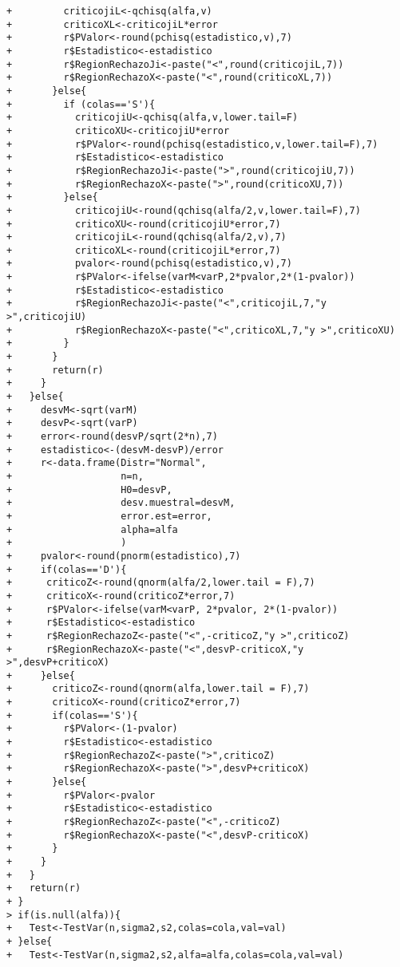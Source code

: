\begin{solucion}
\begin{verbatim}
+         criticojiL<-qchisq(alfa,v)
+         criticoXL<-criticojiL*error
+         r$PValor<-round(pchisq(estadistico,v),7)
+         r$Estadistico<-estadistico
+         r$RegionRechazoJi<-paste("<",round(criticojiL,7))
+         r$RegionRechazoX<-paste("<",round(criticoXL,7))
+       }else{
+         if (colas=='S'){
+           criticojiU<-qchisq(alfa,v,lower.tail=F)
+           criticoXU<-criticojiU*error
+           r$PValor<-round(pchisq(estadistico,v,lower.tail=F),7)
+           r$Estadistico<-estadistico
+           r$RegionRechazoJi<-paste(">",round(criticojiU,7))
+           r$RegionRechazoX<-paste(">",round(criticoXU,7))
+         }else{
+           criticojiU<-round(qchisq(alfa/2,v,lower.tail=F),7)
+           criticoXU<-round(criticojiU*error,7)
+           criticojiL<-round(qchisq(alfa/2,v),7)
+           criticoXL<-round(criticojiL*error,7)
+           pvalor<-round(pchisq(estadistico,v),7)
+           r$PValor<-ifelse(varM<varP,2*pvalor,2*(1-pvalor))
+           r$Estadistico<-estadistico
+           r$RegionRechazoJi<-paste("<",criticojiL,7,"y >",criticojiU)
+           r$RegionRechazoX<-paste("<",criticoXL,7,"y >",criticoXU)
+         }
+       }
+       return(r)
+     }
+   }else{
+     desvM<-sqrt(varM)
+     desvP<-sqrt(varP)
+     error<-round(desvP/sqrt(2*n),7)
+     estadistico<-(desvM-desvP)/error
+     r<-data.frame(Distr="Normal",
+                   n=n,
+                   H0=desvP,
+                   desv.muestral=desvM,
+                   error.est=error,
+                   alpha=alfa
+                   )
+     pvalor<-round(pnorm(estadistico),7)
+     if(colas=='D'){
+      criticoZ<-round(qnorm(alfa/2,lower.tail = F),7)
+      criticoX<-round(criticoZ*error,7)
+      r$PValor<-ifelse(varM<varP, 2*pvalor, 2*(1-pvalor))
+      r$Estadistico<-estadistico
+      r$RegionRechazoZ<-paste("<",-criticoZ,"y >",criticoZ)
+      r$RegionRechazoX<-paste("<",desvP-criticoX,"y >",desvP+criticoX)
+     }else{
+       criticoZ<-round(qnorm(alfa,lower.tail = F),7)
+       criticoX<-round(criticoZ*error,7)
+       if(colas=='S'){
+         r$PValor<-(1-pvalor)
+         r$Estadistico<-estadistico
+         r$RegionRechazoZ<-paste(">",criticoZ)
+         r$RegionRechazoX<-paste(">",desvP+criticoX)
+       }else{
+         r$PValor<-pvalor
+         r$Estadistico<-estadistico
+         r$RegionRechazoZ<-paste("<",-criticoZ)
+         r$RegionRechazoX<-paste("<",desvP-criticoX)
+       }
+     }
+   }
+   return(r)
+ }
> if(is.null(alfa)){
+   Test<-TestVar(n,sigma2,s2,colas=cola,val=val)
+ }else{
+   Test<-TestVar(n,sigma2,s2,alfa=alfa,colas=cola,val=val)

\end{verbatim}
\end{solucion}

